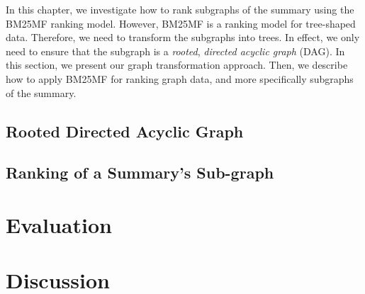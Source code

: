 In this chapter, we investigate how to rank subgraphs of the summary using the BM25MF ranking model. However, BM25MF is a ranking model for tree-shaped data. Therefore, we need to transform the subgraphs into trees. In effect, we only need to ensure that the subgraph is a \emph{rooted}, \emph{directed acyclic graph} (DAG). In this section, we present our graph transformation approach. Then, we describe how to apply BM25MF for ranking graph data, and more specifically subgraphs of the summary.

\subsection{Rooted Directed Acyclic Graph}

\subsection{Ranking of a Summary's Sub-graph}

\section{Evaluation}
\label{chap:summary-ranking:evaluation}

\section{Discussion}
\label{chap:summary-ranking:discuss}


